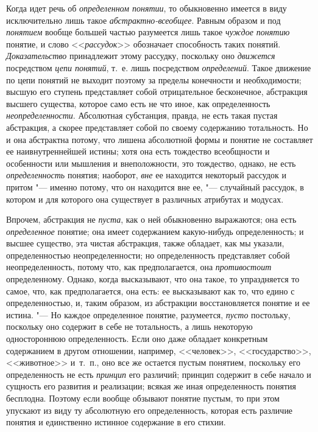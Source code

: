{Когда идет речь об
{\em определенном понятии},
то обыкновенно имеется в виду исключительно лишь такое
{\em абстрактно-всеобщее}.
Равным образом и под
{\em понятием} вообще
большей частью разумеется лишь такое
{\em чуждое понятию}
понятие, и слово
<<{\em рассудок}>>
обозначает способность таких понятий.
{\em Доказательство}
принадлежит этому рассудку, поскольку оно
{\em движется}
посредством {\em цепи
понятий}, т.~е. лишь посредством
{\em определений}. Такое
движение по цепи понятий не выходит поэтому за пределы конечности и
необходимости; высшую его ступень представляет собой отрицательное
бесконечное, абстракция высшего существа, которое само есть не что иное,
как определенность
{\em неопределенности}.
Абсолютная субстанция, правда, не есть такая пустая
абстракция, а скорее представляет собой по своему содержанию тотальность.
Но и она абстрактна потому, что лишена абсолютной формы и понятие не
составляет ее наивнутреннейшей истины; хотя она есть тождество всеобщности
и особенности или мышления и внеположности, это тождество,
однако, не есть {\em определенность}
понятия; наоборот,
{\em вне} ее находится
некоторый рассудок и притом "--- именно потому, что он
находится вне ее, "--- случайный рассудок, в котором и для
которого она существует в различных атрибутах и
модусах.

Впрочем, абстракция не
{\em пуста}, как о ней
обыкновенно выражаются; она есть
{\em определенное}
понятие; она имеет содержанием какую-нибудь определенность; и
высшее существо, эта чистая абстракция, также обладает, как мы указали,
определенностью неопределенности; но определенность представляет собой
неопределенность, потому что, как предполагается, она
{\em противостоит}
определенному. Однако, когда высказывают, что она такое, то
упраздняется то самое, что, как предполагается, она есть: ее высказывают
как то, что едино с определенностью, и, таким образом, из абстракции
восстановляется понятие и ее истина. "--- Но каждое
определенное понятие, разумеется,
{\em пусто} постольку,
поскольку оно содержит в себе не тотальность, а лишь некоторую
одностороннюю определенность. Если оно даже обладает конкретным содержанием
в другом отношении, например, <<человек>>, <<государство>>, <<животное>> и~т.~п.,
оно все же остается пустым понятием, поскольку его определенность не есть
{\em принцип} его
различий; принцип содержит в себе начало и сущность его развития и
реализации; всякая же иная определенность понятия бесплодна. Поэтому если
вообще обзывают понятие пустым, то при этом упускают из виду ту абсолютную
его определенность, которая есть различие понятия и единственно истинное
содержание в его стихии.

}
